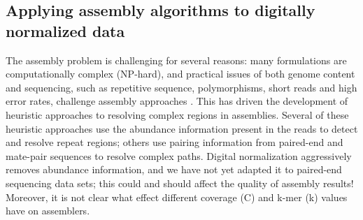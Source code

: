 \documentclass{pnastwo}
\begin{document}
\begin{article}

\subsection{Applying assembly algorithms to digitally normalized data}


The assembly problem is challenging for several reasons: many
formulations are computationally complex (NP-hard), and practical issues of both genome content
and sequencing, such as repetitive sequence, polymorphisms, short
reads and high error rates, challenge assembly approaches
\cite{pubmed19580519}.  This has driven the development of heuristic
approaches to resolving complex regions in assemblies.  Several of
these heuristic approaches use the abundance information present in
the reads to detect and resolve repeat regions; others use pairing
information from paired-end and mate-pair sequences to resolve complex
paths.  Digital normalization aggressively removes abundance
information, and we have not yet adapted it to paired-end sequencing
data sets; this could and should affect the quality of assembly
results! Moreover, it is not clear what effect different coverage (C)
and k-mer (k) values have on assemblers.



\end{article}
\end{document}
